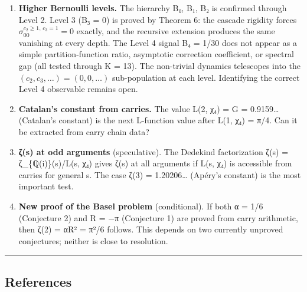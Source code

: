 \documentclass[
  11pt,
]{article}
\begin{document}
\begin{enumerate}
  \textbf{Base universality.} For base b ≥ 3, the Markov sum S\_b(0) =
  b²/(b²−1). Is the exact sector ratio R\_b rational for all b ≥ 3? Exact
  enumeration for base 3 and base 5 would test this. The conjecture R₅ = 5/4 has
  preliminary numerical support.
\item
  \textbf{Higher Bernoulli levels.} The hierarchy B₀, \textbar B₁\textbar, B₂ is
  confirmed through Level 2. Level 3 (B₃ = 0) is proved by Theorem 6: the
  cascade rigidity forces \(\sigma_{00}^{c_2 \geq 1,\, c_3=1} = 0\) exactly, and
  the recursive extension produces the same vanishing at every depth. The Level
  4 signal \textbar B₄\textbar{} = 1/30 does not appear as a simple
  partition-function ratio, asymptotic correction coefficient, or spectral gap
  (all tested through K = 13). The non-trivial dynamics telescopes into the
  \((c_2, c_3, \ldots) = (0, 0, \ldots)\) sub-population at each level.
  Identifying the correct Level 4 observable remains open.
\item
  \textbf{Catalan's constant from carries.} The value L(2, χ₄) = G =
  0.9159\ldots{} (Catalan's constant) is the next L-function value after L(1,
  χ₄) = π/4. Can it be extracted from carry chain data?
\item
  \textbf{ζ(s) at odd arguments} (speculative). The Dedekind factorization ζ(s)
  = ζ\_\{ℚ(i)\}(s)/L(s, χ₄) gives ζ(s) at all arguments if L(s, χ₄) is
  accessible from carries for general s. The case ζ(3) = 1.20206\ldots{}
  (Apéry's constant) is the most important test.
\item
  \textbf{New proof of the Basel problem} (conditional). If both α = 1/6
  (Conjecture 2) and R = −π (Conjecture 1) are proved from carry arithmetic,
  then ζ(2) = αR² = π²/6 follows. This depends on two currently unproved
  conjectures; neither is close to resolution.
\end{enumerate}

\begin{center}\rule{0.5\linewidth}{0.5pt}\end{center}

\newpage

\subsection{References}\label{references}
\end{document}
